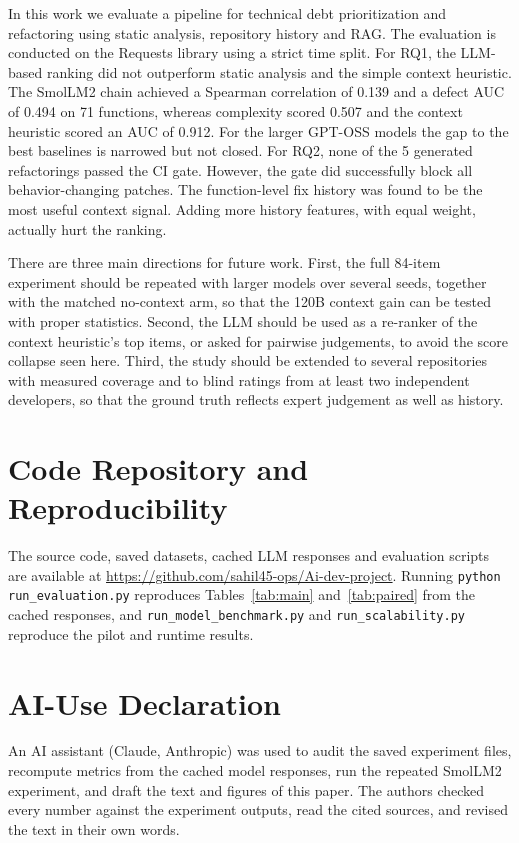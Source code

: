 \documentclass[12pt,onecolumn,draftclsnofoot]{IEEEtran}
\begin{document}
In this work we evaluate a pipeline for technical debt prioritization and refactoring using static analysis, repository history and RAG. The evaluation is conducted on the Requests library using a strict time split. For RQ1, the LLM-based ranking did not outperform static analysis and the simple context heuristic. The SmolLM2 chain achieved a Spearman correlation of 0.139 and a defect AUC of 0.494 on 71 functions, whereas complexity scored 0.507 and the context heuristic scored an AUC of 0.912. For the larger GPT-OSS models the gap to the best baselines is narrowed but not closed. For RQ2, none of the 5 generated refactorings passed the CI gate. However, the gate did successfully block all behavior-changing patches. The function-level fix history was found to be the most useful context signal. Adding more history features, with equal weight, actually hurt the ranking.

There are three main directions for future work. First, the full 84-item experiment should be repeated with larger models over several seeds, together with the matched no-context arm, so that the 120B context gain can be tested with proper statistics. Second, the LLM should be used as a re-ranker of the context heuristic's top items, or asked for pairwise judgements, to avoid the score collapse seen here. Third, the study should be extended to several repositories with measured coverage and to blind ratings from at least two independent developers, so that the ground truth reflects expert judgement as well as history.

\section*{Code Repository and Reproducibility}

The source code, saved datasets, cached LLM responses and evaluation scripts are available at \url{https://github.com/sahil45-ops/Ai-dev-project}. Running \texttt{python run\_evaluation.py} reproduces Tables~\ref{tab:main} and~\ref{tab:paired} from the cached responses, and \texttt{run\_model\_benchmark.py} and \texttt{run\_scalability.py} reproduce the pilot and runtime results.

\section*{AI-Use Declaration}

An AI assistant (Claude, Anthropic) was used to audit the saved experiment files, recompute metrics from the cached model responses, run the repeated SmolLM2 experiment, and draft the text and figures of this paper. The authors checked every number against the experiment outputs, read the cited sources, and revised the text in their own words.
\end{document}

